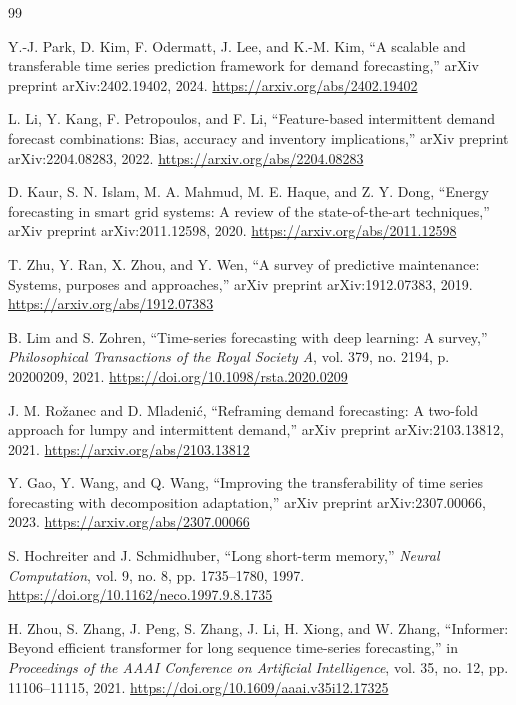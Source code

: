 \documentclass[review,number,sort&compress]{elsarticle}
\begin{document}
\begin{thebibliography}{99}



Y.-J. Park, D. Kim, F. Odermatt, J. Lee, and K.-M. Kim, ``A scalable and transferable time series prediction framework for demand forecasting,'' arXiv preprint arXiv:2402.19402, 2024. \url{https://arxiv.org/abs/2402.19402}

L. Li, Y. Kang, F. Petropoulos, and F. Li, ``Feature-based intermittent demand forecast combinations: Bias, accuracy and inventory implications,'' arXiv preprint arXiv:2204.08283, 2022. \url{https://arxiv.org/abs/2204.08283}

D. Kaur, S. N. Islam, M. A. Mahmud, M. E. Haque, and Z. Y. Dong, ``Energy forecasting in smart grid systems: A review of the state-of-the-art techniques,'' arXiv preprint arXiv:2011.12598, 2020. \url{https://arxiv.org/abs/2011.12598}

T. Zhu, Y. Ran, X. Zhou, and Y. Wen, ``A survey of predictive maintenance: Systems, purposes and approaches,'' arXiv preprint arXiv:1912.07383, 2019. \url{https://arxiv.org/abs/1912.07383}

B. Lim and S. Zohren, ``Time-series forecasting with deep learning: A survey,'' \emph{Philosophical Transactions of the Royal Society A}, vol. 379, no. 2194, p. 20200209, 2021. \url{https://doi.org/10.1098/rsta.2020.0209}

J. M. Ro\v{z}anec and D. Mladeni\'c, ``Reframing demand forecasting: A two-fold approach for lumpy and intermittent demand,'' arXiv preprint arXiv:2103.13812, 2021. \url{https://arxiv.org/abs/2103.13812}

Y. Gao, Y. Wang, and Q. Wang, ``Improving the transferability of time series forecasting with decomposition adaptation,'' arXiv preprint arXiv:2307.00066, 2023. \url{https://arxiv.org/abs/2307.00066}

S. Hochreiter and J. Schmidhuber, ``Long short-term memory,'' \emph{Neural Computation}, vol. 9, no. 8, pp. 1735--1780, 1997. \url{https://doi.org/10.1162/neco.1997.9.8.1735}

H. Zhou, S. Zhang, J. Peng, S. Zhang, J. Li, H. Xiong, and W. Zhang, ``Informer: Beyond efficient transformer for long sequence time-series forecasting,'' in \emph{Proceedings of the AAAI Conference on Artificial Intelligence}, vol. 35, no. 12, pp. 11106--11115, 2021. \url{https://doi.org/10.1609/aaai.v35i12.17325}


\end{thebibliography}
\end{document}
